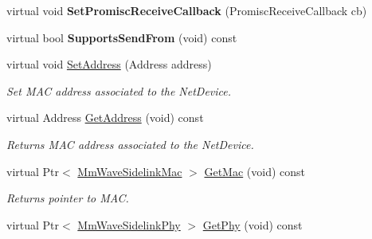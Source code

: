 \begin{DoxyCompactItemize}
\mbox{\label{classns3_1_1millicar_1_1MmWaveVehicularNetDevice_a1f508820c02dce66bcb71fdf4a006909}} 
virtual void {\bfseries Set\+Promisc\+Receive\+Callback} (Promisc\+Receive\+Callback cb)
\item 
\mbox{\label{classns3_1_1millicar_1_1MmWaveVehicularNetDevice_a69dd9d59a5d72b632e7b42e55daa5835}} 
virtual bool {\bfseries Supports\+Send\+From} (void) const
\item 
virtual void \hyperlink{classns3_1_1millicar_1_1MmWaveVehicularNetDevice_a3932dafc57cc997401c3d0d14d647287}{Set\+Address} (Address address)
\begin{DoxyCompactList}\small\item\em Set M\+AC address associated to the Net\+Device. \end{DoxyCompactList}\item 
\mbox{\label{classns3_1_1millicar_1_1MmWaveVehicularNetDevice_a387893f7a3fe0eb9db5505d0ade5c583}} 
virtual Address \hyperlink{classns3_1_1millicar_1_1MmWaveVehicularNetDevice_a387893f7a3fe0eb9db5505d0ade5c583}{Get\+Address} (void) const
\begin{DoxyCompactList}\small\item\em Returns M\+AC address associated to the Net\+Device. \end{DoxyCompactList}\item 
\mbox{\label{classns3_1_1millicar_1_1MmWaveVehicularNetDevice_a840697a126197bbbc7d71ac4250fb39c}} 
virtual Ptr$<$ \hyperlink{classns3_1_1millicar_1_1MmWaveSidelinkMac}{Mm\+Wave\+Sidelink\+Mac} $>$ \hyperlink{classns3_1_1millicar_1_1MmWaveVehicularNetDevice_a840697a126197bbbc7d71ac4250fb39c}{Get\+Mac} (void) const
\begin{DoxyCompactList}\small\item\em Returns pointer to M\+AC. \end{DoxyCompactList}\item 
\mbox{\label{classns3_1_1millicar_1_1MmWaveVehicularNetDevice_aec2c2afec33925b2186204d2bae3d080}} 
virtual Ptr$<$ \hyperlink{classns3_1_1millicar_1_1MmWaveSidelinkPhy}{Mm\+Wave\+Sidelink\+Phy} $>$ \hyperlink{classns3_1_1millicar_1_1MmWaveVehicularNetDevice_aec2c2afec33925b2186204d2bae3d080}{Get\+Phy} (void) const

\end{DoxyCompactItemize}
